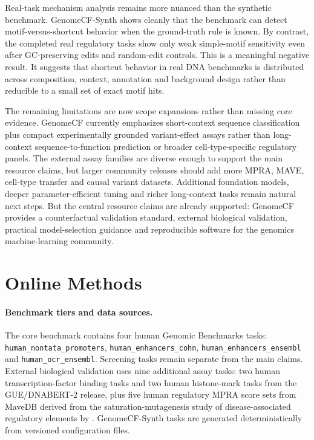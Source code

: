 \documentclass[11pt]{article}
\begin{document}
Real-task mechanism analysis remains more nuanced than the synthetic benchmark. GenomeCF-Synth shows cleanly that the benchmark can detect motif-versus-shortcut behavior when the ground-truth rule is known. By contrast, the completed real regulatory tasks show only weak simple-motif sensitivity even after GC-preserving edits and random-edit controls. This is a meaningful negative result. It suggests that shortcut behavior in real DNA benchmarks is distributed across composition, context, annotation and background design rather than reducible to a small set of exact motif hits.

The remaining limitations are now scope expansions rather than missing core evidence. GenomeCF currently emphasizes short-context sequence classification plus compact experimentally grounded variant-effect assays rather than long-context sequence-to-function prediction or broader cell-type-specific regulatory panels. The external assay families are diverse enough to support the main resource claims, but larger community releases should add more MPRA, MAVE, cell-type transfer and causal variant datasets. Additional foundation models, deeper parameter-efficient tuning and richer long-context tasks remain natural next steps. But the central resource claims are already supported: GenomeCF provides a counterfactual validation standard, external biological validation, practical model-selection guidance and reproducible software for the genomics machine-learning community.

\section{Online Methods}
\paragraph{Benchmark tiers and data sources.}
The core benchmark contains four human Genomic Benchmarks tasks: \texttt{human\_nontata\_promoters}, \texttt{human\_enhancers\_cohn}, \texttt{human\_enhancers\_ensembl} and \texttt{human\_ocr\_ensembl}. Screening tasks remain separate from the main claims. External biological validation uses nine additional assay tasks: two human transcription-factor binding tasks and two human histone-mark tasks from the GUE/DNABERT-2 release, plus five human regulatory MPRA score sets from MaveDB derived from the saturation-mutagenesis study of disease-associated regulatory elements by \citet{kircher2019regulatory}. GenomeCF-Synth tasks are generated deterministically from versioned configuration files.
\end{document}
